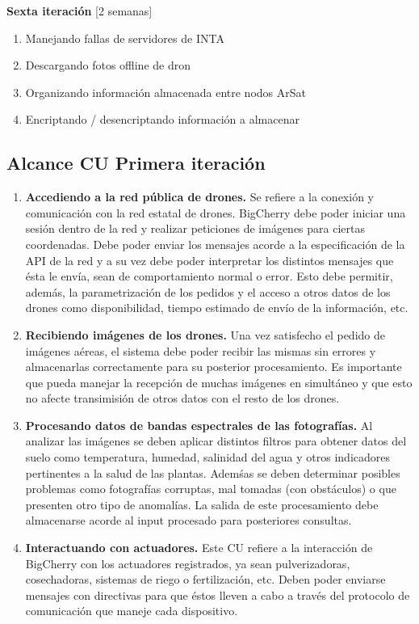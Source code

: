 \noindent \textbf{Sexta iteración} [2 semanas]
    \vspace{-5pt}
	\begin{enumerate} \itemsep -2pt
		\item Manejando fallas de servidores de INTA
		\item Descargando fotos offline de dron
		\item Organizando información almacenada entre nodos ArSat
		\item Encriptando / desencriptando información a almacenar
	\end{enumerate}

\clearpage

\subsection{Alcance CU Primera iteración}
		
\begin{enumerate}
	\item \textbf{Accediendo a la red pública de drones.}
	Se refiere a la conexión y comunicación con la red estatal de drones. BigCherry debe poder iniciar una sesión dentro de la red y realizar peticiones de imágenes para ciertas coordenadas. Debe poder enviar los mensajes acorde a la especificación de la API de la red y a su vez debe poder interpretar los distintos mensajes que ésta le envía, sean de comportamiento normal o error. Esto debe permitir, además, la parametrización de los pedidos y el acceso a otros datos de los drones como disponibilidad, tiempo estimado de envío de la información, etc.

	\item \textbf{Recibiendo imágenes de los drones.}
	Una vez satisfecho el pedido de imágenes aéreas, el sistema debe poder recibir las mismas sin errores y almacenarlas correctamente para su posterior procesamiento. Es importante que pueda manejar la recepción de muchas imágenes en simultáneo y que esto no afecte transimisión de otros datos con el resto de los drones.

	\item \textbf{Procesando datos de bandas espectrales de las fotografías.}
	Al analizar las imágenes se deben aplicar distintos filtros para obtener datos del suelo como temperatura, humedad, salinidad del agua y otros indicadores pertinentes a la salud de las plantas. Ademśas se deben determinar posibles problemas como fotografías corruptas, mal tomadas (con obstáculos) o que presenten otro tipo de anomalías. La salida de este procesamiento debe almacenarse acorde al input procesado para posteriores consultas.

	\item \textbf{Interactuando con actuadores.} 
	Este CU refiere a la interacción de BigCherry con los actuadores registrados, ya sean pulverizadoras, cosechadoras, sistemas de riego o fertilización, etc. Deben poder enviarse mensajes con directivas para que éstos lleven a cabo a través del protocolo de comunicación que maneje cada dispositivo.
\end{enumerate}

